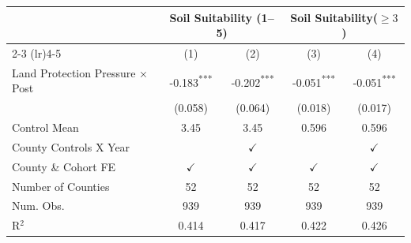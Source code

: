
\begin{tabular}{lcccc}
\toprule
& \multicolumn{2}{c}{Soil Suitability (1–5)} 
& \multicolumn{2}{c}{Soil Suitability($\geq 3$)} \\
\cmidrule(lr){2-3} \cmidrule(lr){4-5}
& (1) & (2) & (3) & (4) \\
\midrule

Land Protection Pressure × Post 
& -0.183\textsuperscript{***} 
& -0.202\textsuperscript{***} 
& -0.051\textsuperscript{***}  
& -0.051\textsuperscript{***} \\
& (0.058) & (0.064) & (0.018) & (0.017) \\[2pt]

Control Mean
& 3.45 & 3.45 & 0.596 & 0.596 \\

County Controls X Year
&  & $\checkmark$ &  & $\checkmark$ \\

County \& Cohort FE 
& $\checkmark$ & $\checkmark$ & $\checkmark$ & $\checkmark$ \\

Number of Counties
& 52 & 52 & 52 & 52 \\

Num. Obs. 
& 939 & 939 & 939 & 939 \\

R$^{2}$ 
& 0.414 & 0.417 & 0.422 & 0.426 \\

\bottomrule
\end{tabular}



